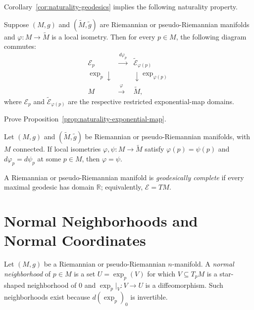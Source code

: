 Corollary~\ref{cor:naturality-geodesics} implies the following naturality
property.

\begin{proposition}
\label{prop:naturality-exponential-map}

Suppose $(M,g)$ and $(\tilde{M},\tilde{g})$ are Riemannian or
pseudo-Riemannian manifolds and $\varphi: M \to \tilde{M}$ is a local
isometry. Then for every $p \in M$, the following diagram commutes:
\[
\begin{array}{ccc}
\mathcal{E}_p & \xrightarrow{\ d\varphi_p\ } & \tilde{\mathcal{E}}_{\varphi(p)} \\
{\scriptstyle \exp_p}\downarrow & & \downarrow{\scriptstyle \exp_{\varphi(p)}} \\
M & \xrightarrow{\ \varphi\ } & \tilde{M},
\end{array}
\]
where $\mathcal E_p$ and $\widetilde{\mathcal E}_{\varphi(p)}$ are the
respective restricted exponential-map domains.
\end{proposition}

\begin{exercise}
\label{exer:prove-proposition-5-20}

Prove Proposition~\ref{prop:naturality-exponential-map}.
\end{exercise}

\begin{proposition}
\label{prop:local-isometries-completely-determined}
Let $(M, g)$ and $(\tilde{M}, \tilde{g})$ be Riemannian or
pseudo-Riemannian manifolds, with $M$ connected. If local isometries
$\varphi, \psi: M \to \tilde{M}$ satisfy
$\varphi(p) = \psi(p)$ and $d\varphi_p = d\psi_p$ at some $p\in M$, then
$\varphi = \psi$.
\end{proposition}

A Riemannian or pseudo-Riemannian manifold is \emph{geodesically complete} if
every maximal geodesic has domain $\mathbb R$; equivalently,
$\mathcal E=TM$.

\section{Normal Neighborhoods and Normal Coordinates}

Let $(M,g)$ be a Riemannian or pseudo-Riemannian $n$-manifold.  A
\emph{normal neighborhood} of $p\in M$ is a set $U=\exp_p(V)$ for which
$V\subseteq T_pM$ is a star-shaped neighborhood of $0$ and
$\exp_p|_V:V\to U$ is a diffeomorphism.  Such neighborhoods exist because
$d(\exp_p)_0$ is invertible.

